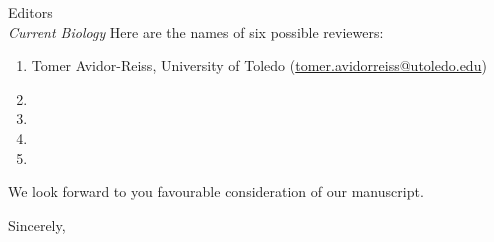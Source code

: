 \documentclass[12pt, twoside, letterpaper]{letter}
\begin{document}
\begin{letter}{Editors \\
    \textit{Current Biology}}
Here are the names of six possible reviewers:
\begin{enumerate}
  \item Tomer Avidor-Reiss, University of Toledo (\url{tomer.avidorreiss@utoledo.edu})
  \item
  \item
  \item
  \item
\end{enumerate}


We look forward to you favourable consideration of our manuscript.

\closing{Sincerely,}


\end{letter}
\end{document}
